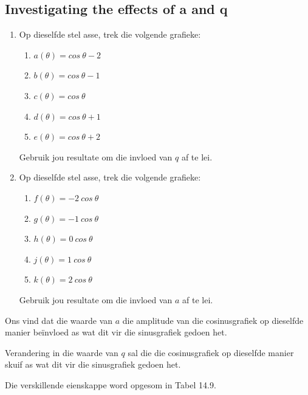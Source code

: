 \subsection*{Investigating the effects of a and q}
\nopagebreak
\begin{enumerate}[noitemsep, label=\textbf{\arabic*}. ] 
\item Op dieselfde stel asse, trek die volgende grafieke:
\begin{enumerate}[noitemsep, label=\textbf{\alph*}. ] 
\item $a(\theta )=cos~\theta -2$
\item $b(\theta )=cos~\theta -1$
\item $c(\theta )=cos~\theta $
\item $d(\theta )=cos~\theta +1$
\item $e(\theta )=cos~\theta +2$\end{enumerate}
Gebruik jou resultate om die invloed van $q$ af te lei.
\item Op dieselfde stel asse, trek die volgende grafieke:
\begin{enumerate}[noitemsep, label=\textbf{\alph*}. ] 
\item $f(\theta )=-2~cos~\theta $
\item $g(\theta )=-1~cos~\theta $
\item $h(\theta )=0~cos~\theta $
\item $j(\theta )=1~cos~\theta $
\item $k(\theta )=2~cos~\theta $\end{enumerate}
Gebruik jou resultate om die invloed van $a$ af te lei.
\end{enumerate}
Ons vind dat die waarde van $a$ die amplitude van die cosinusgrafiek op dieselfde manier beïnvloed as wat dit vir
die sinusgrafiek gedoen het.\par 
Verandering in die waarde van $q$ sal die die cosinusgrafiek op dieselfde manier skuif as wat dit vir die sinusgrafiek
gedoen het.\par 
Die verskillende eienskappe word opgesom in Tabel 14.9.\par 
